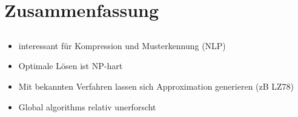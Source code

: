 \section{Zusammenfassung}
\subsection{}


\begin{frame}{\FrameName}
    \begin{itemize}[<+->]
      \item interessant für Kompression und Musterkennung (NLP)
      \item Optimale Lösen ist NP-hart
      \item Mit bekannten Verfahren lassen sich Approximation generieren (zB LZ78)
      \item Global algorithms relativ unerforscht
    \end{itemize}

  \end{frame}